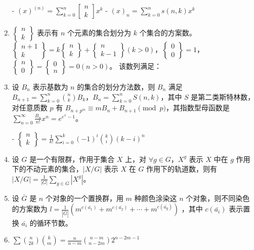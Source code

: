 \begin{enumerate}
- $(x)^{(n)}=\sum_{k=0}^{n}\begin{bmatrix}n\\k\end{bmatrix}x^{k}$
- $(x)_{n}=\sum_{k=0}^{n}s(n,k)x^{k}$

\item $\begin{Bmatrix}n\\k\end{Bmatrix}$ 表示有 $n$ 个元素的集合划分为 $k$ 个集合的方案数。$\begin{Bmatrix}n+1\\k\end{Bmatrix}=k\begin{Bmatrix}n\\k\end{Bmatrix}+\begin{Bmatrix}n\\k-1\end{Bmatrix}(k>0)$，$\begin{Bmatrix}0\\0\end{Bmatrix}=1$，$\begin{Bmatrix}n\\0\end{Bmatrix}=\begin{Bmatrix}0\\n\end{Bmatrix}=0(n>0)$。
该数列满足：

\item 设 $B_{n}$ 表示基数为 $n$ 的集合的划分方法数，则 $B_{n}$ 满足 $B_{n+1}=\sum_{k=0}^{n}{n\choose k}B_{k}$，$B_{n}=\sum_{k=0}^{n}S(n, k)$，其中 $S$ 是第二类斯特林数，对任意质数 $p$ 有 $B_{n+p^{m}}\equiv mB_{n}+B_{n+1}\pmod{p}$，其指数型母函数是 $\sum_{n=0}^{\infty}\frac{B_{n}}{n!}x^{n}=e^{e^{x}-1}$。

- $\begin{Bmatrix}n\\k\end{Bmatrix}=\frac{1}{k!}\sum_{i=0}^{k}(-1)^{i}{k\choose i}(k-i)^{n}$

\item 设 $G$ 是一个有限群，作用于集合 $X$ 上，对 $\forall g\in G$，$X^{g}$ 表示 $X$ 中在 $g$ 作用下的不动元素的集合，$|X/G|$ 表示 $X$ 在 $G$ 作用下的轨道数，则有 $|X/G|=\frac{1}{|G|}\sum_{g\in G}|X^{g}|$。

\item 设 $\bar{G}$ 是 $n$ 个对象的一个置换群，用 $m$ 种颜色涂染这 $n$ 个对象，则不同染色的方案数为 $l=\frac{1}{|\bar{G}|}(m^{c(\bar{a_{1}})}+m^{c(\bar{a_{2}})}+\cdots+m^{c(\bar{a_{g}})})$ ，其中 $c(\bar{a_{i}})$ 表示置换 $\bar{a_{i}}$ 的循环节数。

\item $\sum{n\choose2k}{k\choose m}=\frac{n}{n-m}{n-m\choose n-2m}2^{n-2m-1}$

\end{enumerate}

